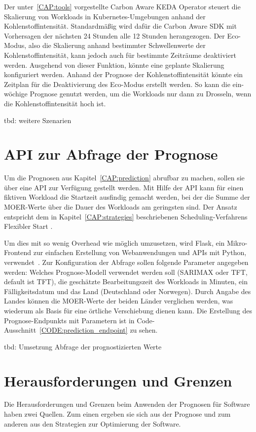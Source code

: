 Der unter~\ref{CAP:tools} vorgestellte Carbon Aware \ac{KEDA} Operator steuert die Skalierung von Workloads in Kubernetes-Umgebungen anhand der Kohlenstoffintensität.
Standardmäßig wird dafür die Carbon Aware SDK mit Vorhersagen der nächsten 24 Stunden alle 12 Stunden herangezogen.
Der Eco-Modus, also die Skalierung anhand bestimmter Schwellenwerte der Kohlenstoffintensität, kann jedoch auch für bestimmte Zeiträume deaktiviert werden.
Ausgehend von dieser Funktion, könnte eine geplante Skalierung konfiguriert werden.
Anhand der Prognose der Kohlenstoffintensität könnte ein Zeitplan für die Deaktivierung des Eco-Modus erstellt werden.
So kann die ein-wöchige Prognose genutzt werden, um die Workloads nur dann zu Drosseln, wenn die Kohlenstoffintensität hoch ist.

tbd: weitere Szenarien

\section{API zur Abfrage der Prognose}
Um die Prognosen aus Kapitel~\ref{CAP:prediction} abrufbar zu machen, sollen sie über eine \ac{API} zur Verfügung gestellt werden.
Mit Hilfe der \ac{API} kann für einen fiktiven Workload die Startzeit ausfindig gemacht werden, bei der die Summe der \ac{MOER}-Werte über die Dauer des Workloads am geringsten sind.
Der Ansatz entspricht dem in Kapitel~\ref{CAP:strategies} beschriebenen Scheduling-Verfahrens \glqq Flexibler Start \grqq{}.

Um dies mit so wenig Overhead wie möglich umzusetzen, wird Flask, ein Mikro-Frontend zur einfachen Erstellung von Webanwendungen und \ac{API}s mit Python, verwendet~\cite{.20240203T21:13:11.000Z}.
Zur Konfiguration der Abfrage sollen folgende Parameter angegeben werden:
Welches Prognose-Modell verwendet werden soll (SARIMAX oder \ac{TFT}, default ist \ac{TFT}), die geschätzte Bearbeitungszeit des Workloads in Minuten, ein Fälligkeitsdatum und das Land (Deutschland oder Norwegen).
Durch Angabe des Landes können die \ac{MOER}-Werte der beiden Länder verglichen werden, was wiederum als Basis für eine örtliche Verschiebung dienen kann.
Die Erstellung des Prognose-Endpunkts mit Parametern ist in Code-Ausschnitt~\ref{CODE:prediction_endpoint} zu sehen.


tbd: Umsetzung Abfrage der prognostizierten Werte
\section{Herausforderungen und Grenzen}
Die Herausforderungen und Grenzen beim Anwenden der Prognosen für Software haben zwei Quellen.
Zum einen ergeben sie sich aus der Prognose und zum anderen aus den Strategien zur Optimierung der Software.


